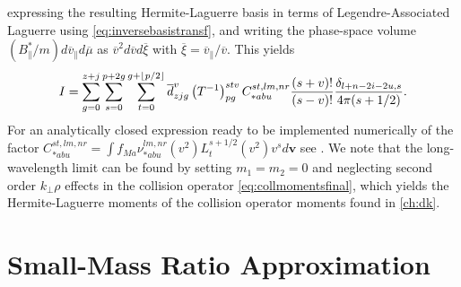 %
expressing the resulting Hermite-Laguerre basis in terms of Legendre-Associated Laguerre using \cref{eq:inversebasistransf}, and writing the phase-space volume $(B_\parallel^{*}/m)d \overline v_\parallel d \overline \mu$ as $\overline v^2 d\overline v d \overline \xi$ with $\overline \xi = \overline v_\parallel/\overline v$.
%
This yields
%
\begin{equation}
    I = \sum_{g=0}^{z+j}\sum_{s=0}^{p+2g}\sum_{t=0}^{g+\lfloor p/2\rfloor}\overline d_{zjg}^v \left(T^{-1}\right)^{stv}_{pg} C_{*abu}^{st,lm,nr}\frac{(s+v)!}{(s-v)!}\frac{\delta_{l+n-2i-2u,s}}{4\pi(s+1/2)}.
\label{eq:finalI}
\end{equation}
%
For an analytically closed expression ready to be implemented numerically of the factor $C_{*abu}^{st,lm,nr}=\int f_{Ma}\nu_{*abu}^{lm,nr}(v^2)L_{t}^{s+1/2}(v^2) v^s d\mathbf v$ see \citet{Ji2009}.
%
We note that the long-wavelength limit can be found by setting $m_1=m_2=0$ and neglecting second order $k_\perp \rho$ effects in the collision operator \cref{eq:collmomentsfinal}, which yields the Hermite-Laguerre moments of the collision operator moments found in \cref{ch:dk}.

\section{Small-Mass Ratio Approximation}
\label{sec:smallmassratio}


